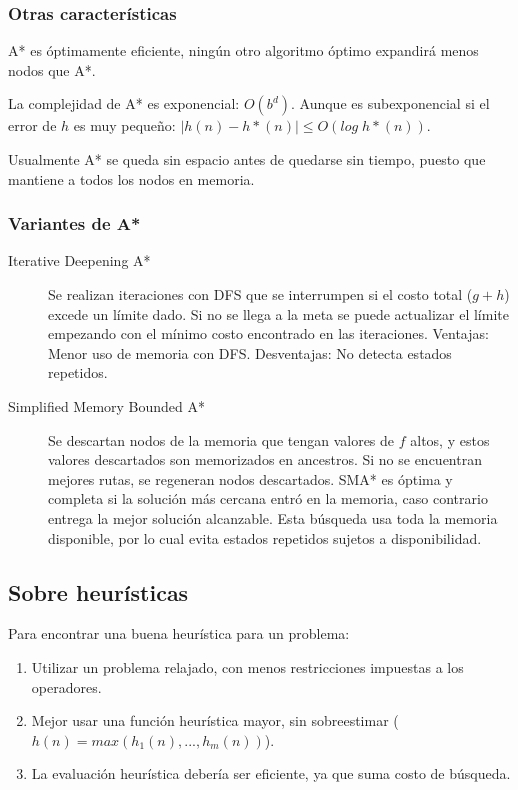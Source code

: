 \documentclass[a4paper,10pt]{paper}
\begin{document}
\subsubsection{Otras características}
A* es óptimamente eficiente, ningún otro algoritmo óptimo expandirá menos nodos
que A*.

La complejidad de A* es exponencial: $O(b^d)$. Aunque es subexponencial si el
error de $h$ es muy pequeño: $| h(n) - h*(n) | \leq O(log\; h*(n))$.

Usualmente A* se queda sin espacio antes de quedarse sin tiempo, puesto que
mantiene a todos los nodos en memoria.

\subsubsection{Variantes de A*}
\begin{description}
    \item[Iterative Deepening A*] Se realizan iteraciones con DFS que se
    interrumpen si el costo total ($g + h$) excede un límite dado. Si no
    se llega a la meta se puede actualizar el límite empezando con el mínimo
    costo encontrado en las iteraciones. Ventajas: Menor uso de memoria con
    DFS. Desventajas: No detecta estados repetidos.
    \item[Simplified Memory Bounded A*] Se descartan nodos de la memoria que
    tengan valores de $f$ altos, y estos valores descartados son memorizados
    en ancestros. Si no se encuentran mejores rutas, se regeneran nodos
    descartados. SMA* es óptima y completa si la solución más cercana entró
    en la memoria, caso contrario entrega la mejor solución alcanzable. Esta
    búsqueda usa toda la memoria disponible, por lo cual evita estados
    repetidos sujetos a disponibilidad.  
\end{description}

\subsection{Sobre heurísticas}
Para encontrar una buena heurística para un problema:
\begin{enumerate}
    \item Utilizar un problema relajado, con menos restricciones impuestas a
    los operadores.
    \item Mejor usar una función heurística mayor, sin sobreestimar
    ($h(n) = max(h_1(n),...,h_m(n))$).
    \item La evaluación heurística debería ser eficiente, ya que suma costo
    de búsqueda.
\end{enumerate}
\end{document}
